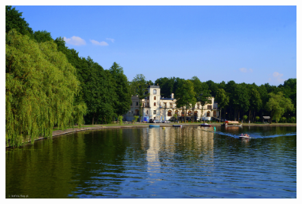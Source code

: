 \documentclass[]{beamer}
\begin{document}
\frame
{
\begin{figure}[here]
\begin{center}
\includegraphics[scale=1]{august.jpg}
\end{center}
\end{figure}
}
\end{document}
